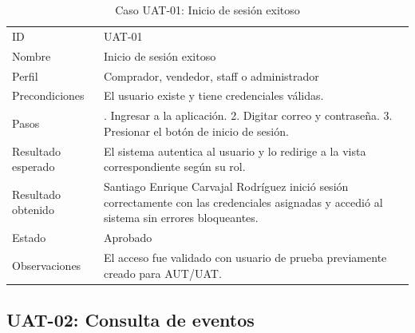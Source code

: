 \documentclass[12pt,letterpaper]{article}
\begin{document}
\begin{table}[H]
\centering
\begingroup
\footnotesize
\setlength{\tabcolsep}{3pt}
\renewcommand{\arraystretch}{1.25}

\begin{tabularx}{\textwidth}{|
>{\raggedright\arraybackslash}p{3.4cm}|
>{\raggedright\arraybackslash}X|}
\hline
\multicolumn{1}{|>{\centering\arraybackslash}m{3.4cm}|}{\textbf{Campo}} &
\multicolumn{1}{>{\centering\arraybackslash}m{10.8cm}|}{\textbf{Contenido}} \\
\hline
ID & UAT-01 \\
\hline
Nombre & Inicio de sesión exitoso \\
\hline
Perfil & Comprador, vendedor, staff o administrador \\
\hline
Precondiciones & El usuario existe y tiene credenciales válidas. \\
\hline
Pasos & 1. Ingresar a la aplicación. 2. Digitar correo y contraseña. 3. Presionar el botón de inicio de sesión. \\
\hline
Resultado esperado & El sistema autentica al usuario y lo redirige a la vista correspondiente según su rol. \\
\hline
Resultado obtenido & Santiago Enrique Carvajal Rodríguez inició sesión correctamente con las credenciales asignadas y accedió al sistema sin errores bloqueantes. \\
\hline
Estado & Aprobado \\
\hline
Observaciones & El acceso fue validado con usuario de prueba previamente creado para AUT/UAT. \\
\hline
\end{tabularx}

\endgroup
\caption{Caso UAT-01: Inicio de sesión exitoso}
\label{tab:uat-01-login}
\end{table}

\subsection{UAT-02: Consulta de eventos}
\end{document}
